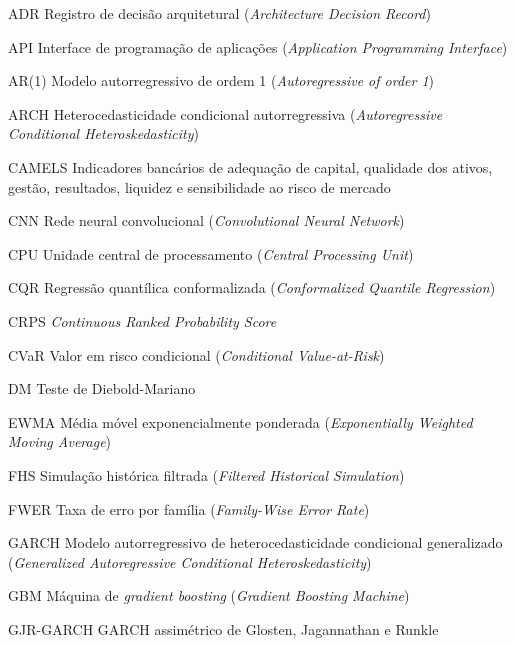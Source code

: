 
\begin{siglas}
    \item[ADR] Registro de decisão arquitetural (\textit{Architecture Decision Record})
    \item[API] Interface de programação de aplicações (\textit{Application Programming Interface})
    \item[AR(1)] Modelo autorregressivo de ordem 1 (\textit{Autoregressive of order 1})
    \item[ARCH] Heterocedasticidade condicional autorregressiva (\textit{Autoregressive Conditional Heteroskedasticity})
    \item[CAMELS] Indicadores bancários de adequação de capital, qualidade dos ativos, gestão, resultados, liquidez e sensibilidade ao risco de mercado
    \item[CNN] Rede neural convolucional (\textit{Convolutional Neural Network})
    \item[CPU] Unidade central de processamento (\textit{Central Processing Unit})
    \item[CQR] Regressão quantílica conformalizada (\textit{Conformalized Quantile Regression})
    \item[CRPS] \textit{Continuous Ranked Probability Score}
    \item[CVaR] Valor em risco condicional (\textit{Conditional Value-at-Risk})
    \item[DM] Teste de Diebold-Mariano
    \item[EWMA] Média móvel exponencialmente ponderada (\textit{Exponentially Weighted Moving Average})
    \item[FHS] Simulação histórica filtrada (\textit{Filtered Historical Simulation})
    \item[FWER] Taxa de erro por família (\textit{Family-Wise Error Rate})
    \item[GARCH] Modelo autorregressivo de heterocedasticidade condicional generalizado (\textit{Generalized Autoregressive Conditional Heteroskedasticity})
    \item[GBM] Máquina de \textit{gradient boosting} (\textit{Gradient Boosting Machine})
    \item[GJR-GARCH] GARCH assimétrico de Glosten, Jagannathan e Runkle

\end{siglas}

